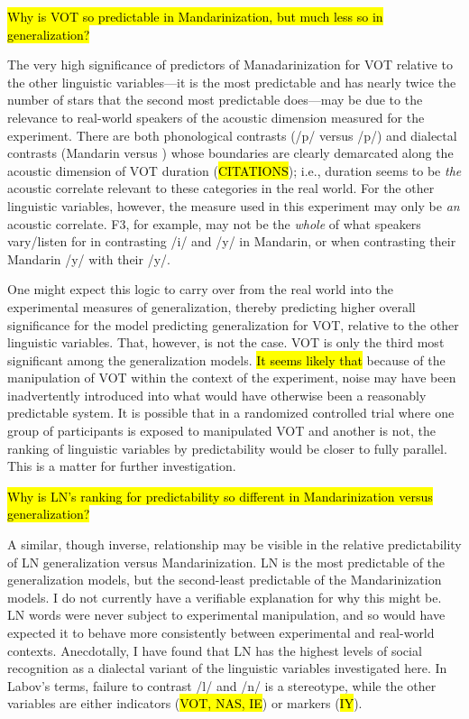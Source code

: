 \hl{Why is VOT so predictable in Mandarinization, but much less so in generalization?}

The very high significance of predictors of Manadarinization for VOT relative to the other linguistic variables---it is the most predictable and has nearly twice the number of stars that the second most predictable does---may be due to the relevance to real-world speakers of the acoustic dimension measured for the experiment. There are both phonological contrasts (/p/ versus /p/) and dialectal contrasts (Mandarin versus \ND{}) whose boundaries are clearly demarcated along the acoustic dimension of VOT duration (\hl{CITATIONS}); i.e., duration seems to be \emph{the} acoustic correlate relevant to these categories in the real world. For the other linguistic variables, however, the measure used in this experiment may only be \emph{an} acoustic correlate. F3, for example, may not be the \emph{whole} of what speakers vary\slash listen for in contrasting /i/ and /y/ in Mandarin, or when contrasting their Mandarin /y/ with their \ND{} /y/.

One might expect this logic to carry over from the real world into the experimental measures of generalization, thereby predicting higher overall significance for the model predicting generalization for VOT, relative to the other linguistic variables. That, however, is not the case. VOT is only the third most significant among the generalization models. \hl{It seems likely that} because of the manipulation of VOT within the context of the experiment, noise may have been inadvertently introduced into what would have otherwise been a reasonably predictable system. It is possible that in a randomized controlled trial where one group of participants is exposed to manipulated VOT and another is not, the ranking of linguistic variables by predictability would be closer to fully parallel. This is a matter for further investigation.

\hl{Why is LN's ranking for predictability so different in Mandarinization versus generalization?}

A similar, though inverse, relationship may be visible in the relative predictability of LN generalization versus Mandarinization. LN is the most predictable of the generalization models, but the second-least predictable of the Mandarinization models. I do not currently have a verifiable explanation for why this might be. LN words were never subject to experimental manipulation, and so would have expected it to behave more consistently between experimental and real-world contexts. Anecdotally, I have found that LN has the highest levels of social recognition as a dialectal variant of the linguistic variables investigated here. In Labov's \citeyearpar{labov1971study} terms, failure to contrast /l/ and /n/ is a \ND{} stereotype, while the other variables are either indicators (\hl{VOT, NAS, IE}) or markers (\hl{IY}).


